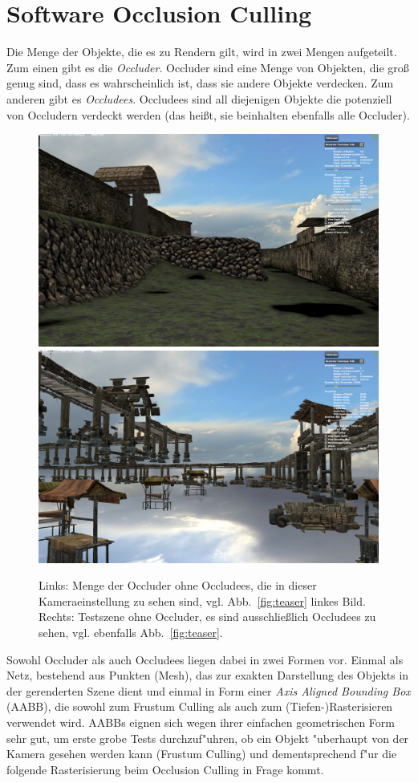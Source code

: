 \documentclass[journal]{vgtc}
\begin{document}
\section{Software Occlusion Culling}
Die Menge der Objekte, die es zu Rendern gilt, wird in zwei Mengen aufgeteilt.
Zum einen gibt es die \textit{Occluder}. Occluder sind eine Menge von Objekten, die gro{\ss} genug sind, dass es wahrscheinlich ist, dass sie andere Objekte verdecken.
Zum anderen gibt es \textit{Occludees}. Occludees sind all diejenigen Objekte die potenziell von Occludern verdeckt werden (das hei{\ss}t, sie beinhalten ebenfalls alle Occluder).
\begin{figure}%
\includegraphics[width=0.5\columnwidth]{images/Occluder.png}%
\includegraphics[width=0.5\columnwidth]{images/Occludees.png}%
\caption{Links: Menge der Occluder ohne Occludees, die in dieser Kameraeinstellung zu sehen sind, vgl. Abb.\ \ref{fig:teaser} linkes Bild. Rechts: Testszene ohne Occluder, es sind ausschlie{\ss}lich Occludees zu sehen, vgl. ebenfalls Abb.\ \ref{fig:teaser}.}%
\label{fig:objects}%
\end{figure}
Sowohl Occluder als auch Occludees liegen dabei in zwei Formen vor.
Einmal als Netz, bestehend aus Punkten (Mesh), das zur exakten Darstellung des Objekts in der gerenderten Szene dient und einmal in Form einer \textit{Axis Aligned Bounding Box} (AABB), die sowohl zum Frustum Culling als auch zum (Tiefen-)Rasterisieren verwendet wird.
AABBs eignen sich wegen ihrer einfachen geometrischen Form sehr gut, um erste grobe Tests durchzuf"uhren, ob ein Objekt "uberhaupt von der Kamera gesehen werden kann (Frustum Culling) und dementsprechend f"ur die folgende Rasterisierung beim Occlusion Culling in Frage kommt. \\
\end{document}
